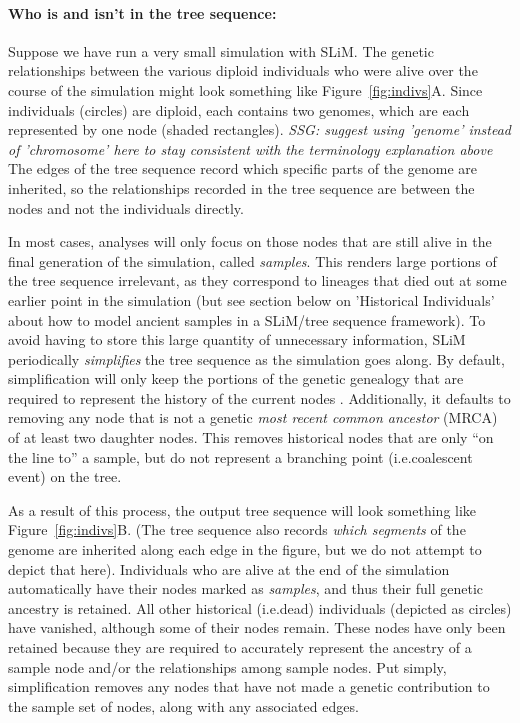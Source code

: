 \documentclass[12pt]{article}
\newcommand*{\ie}{i.e.\xcomma}
\newcommand{\comment}[1]{\textit{\color{green} #1}}
\begin{document}
\paragraph{Who is and isn't in the tree sequence:}
Suppose we have run a very small simulation with SLiM. The genetic relationships between
the various diploid individuals who were alive over the course of the simulation might
look something like Figure~\ref{fig:indivs}A. Since individuals (circles) are diploid, each contains
two genomes, which are each represented by one node (shaded rectangles).
\comment{SSG: suggest using 'genome' instead of 'chromosome' here to stay consistent with the terminology explanation above}
The edges of the tree sequence record which specific parts of the genome are inherited,
so the relationships recorded in the tree sequence are between the nodes and not the individuals directly.

In most cases, analyses will only focus on those nodes that are still alive in the final generation
of the simulation, called \textit{samples}. This renders large portions of the tree sequence irrelevant, as they
correspond to lineages that died out at some earlier point in the simulation (but see section below on
'Historical Individuals' about how to model ancient samples in a SLiM/tree sequence framework). To avoid having to
store this large quantity of unnecessary information, SLiM periodically \textit{simplifies} the tree sequence
as the simulation goes along. By default, simplification will only keep the portions of the
genetic genealogy that are required to represent the history of the current nodes
\citep{kelleher}. Additionally, it defaults to removing any node that is not a genetic
\textit{most recent common ancestor} (MRCA) of at least two daughter nodes. This removes historical
nodes that are only ``on the line to'' a sample, but do not represent a branching point
(\ie coalescent event) on the tree.

As a result of this process, the output tree sequence will look something like Figure~\ref{fig:indivs}B.
(The tree sequence also records \emph{which segments} of the genome are inherited
along each edge in the figure, but we do not attempt to depict that here).
Individuals who are alive at the end of the simulation automatically have their nodes marked as
\textit{samples}, and thus their full genetic ancestry is retained. All other historical (\ie dead)
individuals (depicted as circles) have vanished, although some of their nodes remain. These nodes
have only been retained because they are required to accurately represent the
ancestry of a sample node and/or the relationships among sample nodes. Put simply,
simplification removes any nodes that have not made a genetic contribution to the sample set of nodes,
along with any associated edges.
\end{document}

